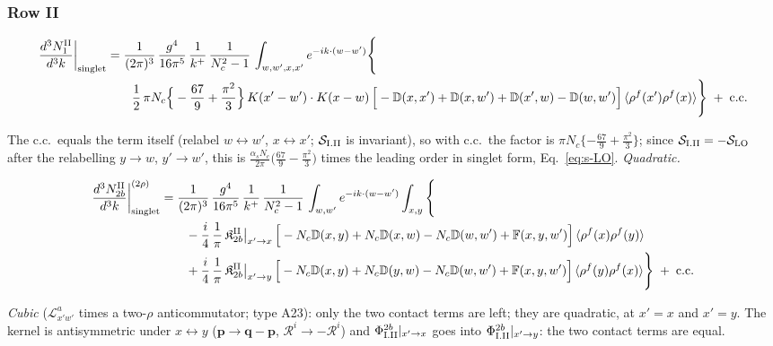 \documentclass[9pt]{article}
\def\mf#1{\mathbb{#1}}
\numberwithin{equation}{section}
\begin{document}
{\subsubsection*{Row II}

\begin{align}
\frac{d^{3}N_{1}^{\rm II}}{d^{3}k}\bigg|_{\rm singlet}&=\frac{1}{(2\pi)^{3}}\,\frac{g^{4}}{16\pi^{5}}\,\frac{1}{k^{+}}\,\frac{1}{N_{c}^{2}-1}\,\int_{w,w',x,x'}e^{-ik\cdot(w-w')}\Bigg\{\notag\\
&\qquad \frac{1}{2}\,\pi N_{c}\Big\{-\frac{67}{9}+\frac{\pi^{2}}{3}\Big\}\,K(x'-w')\cdot K(x-w)\,\Big[-\mf{D}(x,x')+\mf{D}(x,w')+\mf{D}(x',w)-\mf{D}(w,w')\Big]\,\langle\rho^{f}(x')\rho^{f}(x)\rangle\Bigg\}\;+\;{\rm c.c.}\label{eq:s-I-II-1}
\end{align}

The c.c.\ equals the term itself (relabel $w\leftrightarrow w'$, $x\leftrightarrow x'$; $\mathcal{S}_{\rm I.II}$ is invariant), so with c.c.\ the factor is $\pi N_{c}\{-\frac{67}{9}+\frac{\pi^{2}}{3}\}$; since $\mathcal{S}_{\rm I.II}=-\mathcal{S}_{\rm LO}$ after the relabelling $y\to w$, $y'\to w'$, this is $\frac{\alpha_{s}N_{c}}{2\pi}\big(\frac{67}{9}-\frac{\pi^{2}}{3}\big)$ times the leading order in singlet form, Eq.~\eqref{eq:s-LO}. \emph{Quadratic.}

\begin{align}
\frac{d^{3}N_{2b}^{\rm II}}{d^{3}k}\bigg|^{(2\rho)}_{\rm singlet}&=\frac{1}{(2\pi)^{3}}\,\frac{g^{4}}{16\pi^{5}}\,\frac{1}{k^{+}}\,\frac{1}{N_{c}^{2}-1}\,\int_{w,w'}e^{-ik\cdot(w-w')}\int_{x,y}\Bigg\{\notag\\
&\qquad -\frac{i}{4}\,\frac{1}{\pi}\,\mathfrak{K}^{\rm II}_{2b}\big|_{x'\to x}\,\Big[-N_{c}\mf{D}(x,y)+N_{c}\mf{D}(x,w)-N_{c}\mf{D}(w,w')+\mf{F}(x,y,w')\Big]\,\langle\rho^{f}(x)\rho^{f}(y)\rangle\notag\\
&\qquad +\frac{i}{4}\,\frac{1}{\pi}\,\mathfrak{K}^{\rm II}_{2b}\big|_{x'\to y}\,\Big[-N_{c}\mf{D}(x,y)+N_{c}\mf{D}(y,w)-N_{c}\mf{D}(w,w')+\mf{F}(x,y,w')\Big]\,\langle\rho^{f}(y)\rho^{f}(x)\rangle\Bigg\}\;+\;{\rm c.c.}\label{eq:s-I-II-2b}
\end{align}

\emph{Cubic} ($\mathcal{L}^{a}_{x'w'}$ times a two-$\rho$ anticommutator; type A23): only the two contact terms are left; they are quadratic, at $x'=x$ and $x'=y$. The kernel is antisymmetric under $x\leftrightarrow y$ ($\mathbf{p}\to\mathbf{q}-\mathbf{p}$, $\mathcal{R}^{i}\to-\mathcal{R}^{i}$) and $\Phi^{2b}_{\rm I.II}|_{x'\to x}$ goes into $\Phi^{2b}_{\rm I.II}|_{x'\to y}$: the two contact terms are equal.

}
\end{document}

